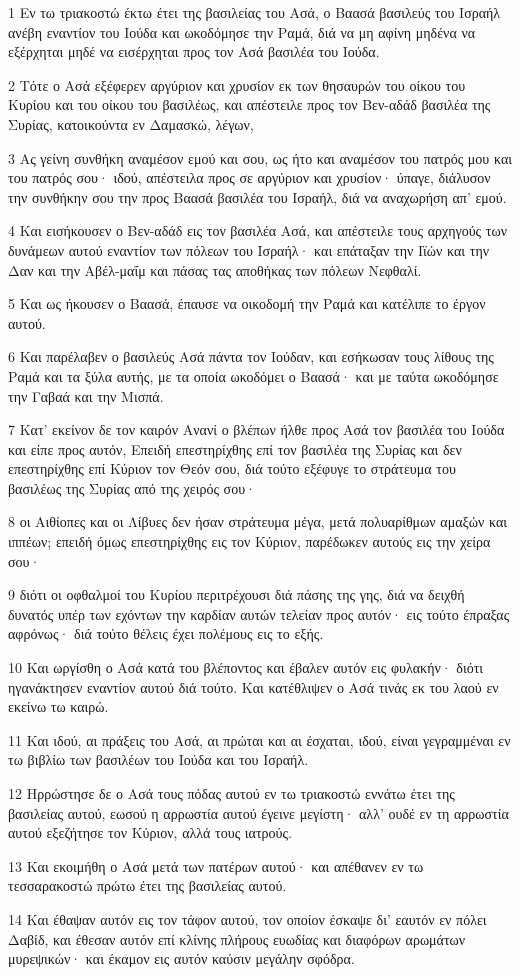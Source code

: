 \par 1 Εν τω τριακοστώ έκτω έτει της βασιλείας του Ασά, ο Βαασά βασιλεύς του Ισραήλ ανέβη εναντίον του Ιούδα και ωκοδόμησε την Ραμά, διά να μη αφίνη μηδένα να εξέρχηται μηδέ να εισέρχηται προς τον Ασά βασιλέα του Ιούδα.
\par 2 Τότε ο Ασά εξέφερεν αργύριον και χρυσίον εκ των θησαυρών του οίκου του Κυρίου και του οίκου του βασιλέως, και απέστειλε προς τον Βεν-αδάδ βασιλέα της Συρίας, κατοικούντα εν Δαμασκώ, λέγων,
\par 3 Ας γείνη συνθήκη αναμέσον εμού και σου, ως ήτο και αναμέσον του πατρός μου και του πατρός σου· ιδού, απέστειλα προς σε αργύριον και χρυσίον· ύπαγε, διάλυσον την συνθήκην σου την προς Βαασά βασιλέα του Ισραήλ, διά να αναχωρήση απ' εμού.
\par 4 Και εισήκουσεν ο Βεν-αδάδ εις τον βασιλέα Ασά, και απέστειλε τους αρχηγούς των δυνάμεων αυτού εναντίον των πόλεων του Ισραήλ· και επάταξαν την Ιϊών και την Δαν και την Αβέλ-μαΐμ και πάσας τας αποθήκας των πόλεων Νεφθαλί.
\par 5 Και ως ήκουσεν ο Βαασά, έπαυσε να οικοδομή την Ραμά και κατέλιπε το έργον αυτού.
\par 6 Και παρέλαβεν ο βασιλεύς Ασά πάντα τον Ιούδαν, και εσήκωσαν τους λίθους της Ραμά και τα ξύλα αυτής, με τα οποία ωκοδόμει ο Βαασά· και με ταύτα ωκοδόμησε την Γαβαά και την Μισπά.
\par 7 Κατ' εκείνον δε τον καιρόν Ανανί ο βλέπων ήλθε προς Ασά τον βασιλέα του Ιούδα και είπε προς αυτόν, Επειδή επεστηρίχθης επί τον βασιλέα της Συρίας και δεν επεστηρίχθης επί Κύριον τον Θεόν σου, διά τούτο εξέφυγε το στράτευμα του βασιλέως της Συρίας από της χειρός σου·
\par 8 οι Αιθίοπες και οι Λίβυες δεν ήσαν στράτευμα μέγα, μετά πολυαρίθμων αμαξών και ιππέων; επειδή όμως επεστηρίχθης εις τον Κύριον, παρέδωκεν αυτούς εις την χείρα σου·
\par 9 διότι οι οφθαλμοί του Κυρίου περιτρέχουσι διά πάσης της γης, διά να δειχθή δυνατός υπέρ των εχόντων την καρδίαν αυτών τελείαν προς αυτόν· εις τούτο έπραξας αφρόνως· διά τούτο θέλεις έχει πολέμους εις το εξής.
\par 10 Και ωργίσθη ο Ασά κατά του βλέποντος και έβαλεν αυτόν εις φυλακήν· διότι ηγανάκτησεν εναντίον αυτού διά τούτο. Και κατέθλιψεν ο Ασά τινάς εκ του λαού εν εκείνω τω καιρώ.
\par 11 Και ιδού, αι πράξεις του Ασά, αι πρώται και αι έσχαται, ιδού, είναι γεγραμμέναι εν τω βιβλίω των βασιλέων του Ιούδα και του Ισραήλ.
\par 12 Ηρρώστησε δε ο Ασά τους πόδας αυτού εν τω τριακοστώ εννάτω έτει της βασιλείας αυτού, εωσού η αρρωστία αυτού έγεινε μεγίστη· αλλ' ουδέ εν τη αρρωστία αυτού εξεζήτησε τον Κύριον, αλλά τους ιατρούς.
\par 13 Και εκοιμήθη ο Ασά μετά των πατέρων αυτού· και απέθανεν εν τω τεσσαρακοστώ πρώτω έτει της βασιλείας αυτού.
\par 14 Και έθαψαν αυτόν εις τον τάφον αυτού, τον οποίον έσκαψε δι' εαυτόν εν πόλει Δαβίδ, και έθεσαν αυτόν επί κλίνης πλήρους ευωδίας και διαφόρων αρωμάτων μυρεψικών· και έκαμον εις αυτόν καύσιν μεγάλην σφόδρα.

